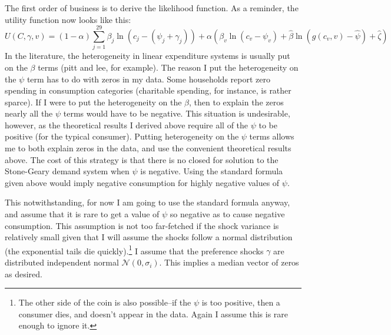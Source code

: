 \documentclass{article}
\begin{document}
The first order of business is to derive the likelihood function.
As a reminder, the utility function now looks like this:
\begin{equation}
	\label{totuti}
U(C,\gamma,v) = (1-\alpha) \sum_{j=1}^{29}\beta_j \ln(c_j - (\psi_j+\gamma_j))  + \alpha \left(\beta_v \ln(c_v - \psi_v)+ \hat{\beta}\ln(g(c_v,v) - \hat{\psi}) + \hat{\zeta} \right)
\end{equation}
In the literature, the heterogeneity in linear expenditure systems is usually put on the $\beta$ terms (pitt and lee, for example).
The reason I put the heterogeneity on the $\psi$ term has to do with zeros in my data.
Some households report zero spending in consumption categories (charitable spending, for instance, is rather sparce).
If I were to put the heterogeneity on the $\beta$, then to explain the zeros nearly all the $\psi$ terms would have to be negative.
This situation is undesirable, however, as the theoretical results I derived above require all of the $\psi$ to be positive (for the typical consumer).
Putting heterogeneity on the $\psi$ terms allows me to both explain zeros in the data, and use the convenient theoretical results above.
The cost of this strategy is that there is no closed for solution to the Stone-Geary demand system when $\psi$ is negative.
 Using the standard formula given above would imply negative consumption for highly negative values of $\psi$.

 This notwithstanding, for now I am going to use the standard formula anyway, and assume that it is rare to get a value of $\psi$ so negative as to cause negative consumption.
 This assumption is not too far-fetched if the shock variance is relatively small given that I will assume the shocks follow a normal distribution (the exponential tails die quickly).\footnote{The other side of the coin is also possible--if the $\psi$ is too positive, then a consumer dies, and doesn't appear in the data.  Again I assume this is rare enough to ignore it.}
I assume that the preference shocks $\gamma$ are distributed independent normal $\mathcal{N}(0,\sigma_i)$.
This implies a median vector of zeros as desired.
\end{document}
